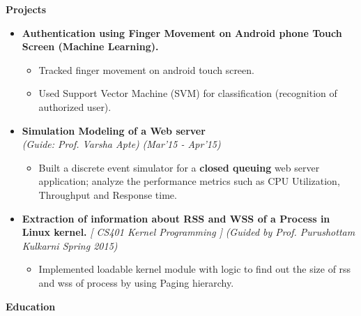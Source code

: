 \documentclass[a4paper,10pt]{article}
\newcommand{\resheading}[1]{{\small \colorbox{mygrey}{\begin{minipage}{0.988\textwidth}{\textbf{ \vphantom{p\^{E}} \large #1}}\end{minipage}}}}
\begin{document}
\vspace{-0.25cm}

\resheading{ Projects}
\begin{itemize}
\item \textbf{Authentication using Finger Movement on Android phone Touch Screen (Machine Learning).}\hfill \\[-0.6cm]
\begin{itemize}
	\item Tracked finger movement on android touch screen.\\[-0.6cm]
	\item Used Support Vector Machine (SVM) for classification (recognition of authorized user).\\[-0.6cm]
\end{itemize}
\vspace{-0.30cm}


\item \textbf{Simulation Modeling of a Web server} \\
\emph{(Guide: Prof. Varsha Apte)} \hfill \emph{(Mar'15 - Apr'15)} \\[-0.6cm]
\begin{itemize}
\item Built a discrete event simulator for a \textbf{closed queuing} web server application; analyze the performance metrics such as CPU Utilization, Throughput and Response time. \\[-0.5cm]

\end{itemize}
	\item \textbf{Extraction of information about RSS and WSS of a Process in Linux kernel.} \hfill \emph{[ CS401 Kernel Programming ]}\hfill 
\emph{(Guided by Prof. Purushottam Kulkarni Spring 2015)} \\[-0.8cm]
\begin{itemize}
\item Implemented loadable kernel module with logic to find out the size of rss and wss of process by using Paging hierarchy. \\[-0.6cm]
\end{itemize}
\end{itemize}


\resheading{Education}
\end{document}
